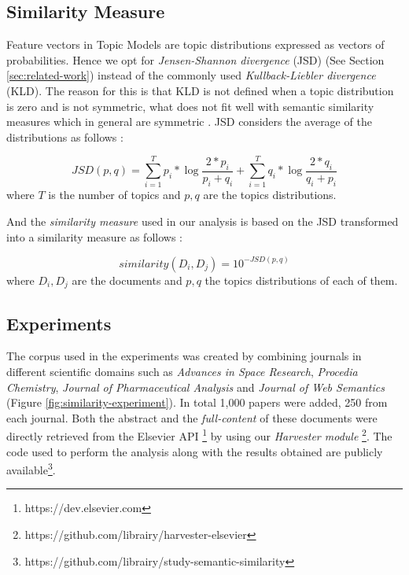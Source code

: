 \subsection{Similarity Measure}
Feature vectors in Topic Models are topic distributions expressed as vectors of probabilities. Hence we opt for \textit{Jensen-Shannon divergence} (JSD) (See Section \ref{sec:related-work})  instead of the commonly used \textit{Kullback-Liebler divergence} (KLD). The reason for this is that KLD is not defined when a topic distribution is zero and is not symmetric, what does not fit well with semantic similarity measures which in general are symmetric \citep{Rus2013}. JSD considers the average of the distributions as follows :

\begin{equation}
JSD(p,q) = \sum\limits_{i=1}^T p_{i}*\log \frac{2*p_{i}}{p_{i}+q_{i}}  +  \sum\limits_{i=1}^T q_{i}*\log \frac{2*q_{i}}{q_{i}+p_{i}}
\label{eq:jsd}
\end{equation}
where  $T$ is the number of topics and $p,q$ are the topics distributions.

And the \textit{similarity measure} used in our analysis is based on the JSD transformed into a similarity measure as follows \citep{Dagan1998} :

\begin{equation}
similarity(D_i , D_j) = 10^{- JSD(p,q)}
\label{eq:simcontent}
\end{equation}
where  $D_i,D_j$ are the documents and $p,q$ the topics distributions of each of them.

\subsection{Experiments}
\label{sec:topic-relevance-experiments}

The corpus used in the experiments was created by combining journals in different scientific domains such as \textit{Advances in Space Research}, \textit{Procedia Chemistry}, \textit{Journal of Pharmaceutical Analysis} and \textit{Journal of Web Semantics} (Figure \ref{fig:similarity-experiment}). In total 1,000 papers were added, 250 from each journal. Both the abstract and the \textit{full-content} of these documents were directly retrieved from the Elsevier API \footnote{https://dev.elsevier.com} by using our \textit{Harvester module} \footnote{https://github.com/librairy/harvester-elsevier}. The code used to perform the analysis along with the results obtained are publicly available\footnote{https://github.com/librairy/study-semantic-similarity}.

